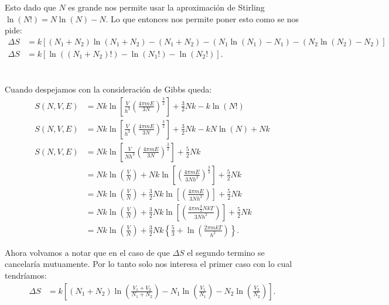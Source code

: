 \documentclass{report}
\begin{document}
Esto dado que $N$ es grande nos permite usar la aproximación de Stirling $\ln\left( N! \right) = N \ln\left( N \right) - N$. Lo que entonces nos permite poner esto como se nos pide:
\begin{align*}
  \Delta S &= k\left[ \left( N_1 + N_2 \right)  \ln \left( N_1 + N_2 \right) - \left( N_1 + N_2 \right) - \left(N_1\ln\left( N_1 \right) - N_1\right) - \left(N_2\ln\left( N_2 \right) - N_2\right) \right] \\
  \Delta S &= k\left[ \ln \left( \left( N_1 + N_2 \right)! \right) - \ln\left( N_1! \right) - \ln\left( N_2! \right)\right]
.\end{align*}

\section{}

Cuando despejamos con la consideración de Gibbs queda:
\begin{align*}
  S\left(N, V, E\right) &= Nk\ln\left[\frac{V}{h^3}\left(\frac{4 \pi m E}{3N}\right)^{\frac{3}{2}}\right] + \frac{3}{2}Nk - k\ln\left( N! \right)  \\
  S\left(N, V, E\right) &= Nk\ln\left[\frac{V}{h^3}\left(\frac{4 \pi m E}{3N}\right)^{\frac{3}{2}}\right] + \frac{3}{2}Nk - kN\ln\left( N \right)+ Nk  \\
  S\left( N, V, E \right) &= Nk\ln\left[ \frac{V}{Nh^{3}}\left( \frac{4\pi mE}{3N} \right)^{\frac{3}{2}} \right] + \frac{5}{2}Nk \\
  &= Nk\ln\left( \frac{V}{N} \right) + Nk\ln\left[ \left( \frac{4\pi mE}{3N h^2} \right)^{\frac{3}{2}} \right] + \frac{5}{2}Nk \\
  &= Nk\ln\left( \frac{V}{N} \right) + \frac{3}{2}Nk\ln\left[ \left( \frac{4\pi mE}{3N h^2} \right) \right] + \frac{5}{2}Nk \\
  &= Nk\ln\left( \frac{V}{N} \right) + \frac{3}{2}Nk\ln\left[ \left( \frac{4\pi m \frac{3}{2} Nk T}{3N h^2} \right) \right] + \frac{5}{2}Nk \\
  &= Nk\ln\left( \frac{V}{N} \right) + \frac{3}{2}Nk\left\{ \frac{5}{3} + \ln \left( \frac{2\pi m kT}{h^2}  \right)  \right\}
.\end{align*}

Ahora volvamos a notar que en el caso de que $\Delta S$ el segundo termino se cancelaría mutuamente. Por lo tanto solo nos interesa el primer caso con lo cual tendríamos:
\begin{align*}
    \Delta S &= k\left[ \left( N_1 + N_2 \right) \ln\left( \frac{V_1 + V_2}{N_1 + N_2} \right) - N_1\ln\left( \frac{V_1}{N_1} \right) - N_2\ln\left( \frac{V_2}{N_2} \right) \right]
.\end{align*}
\end{document}
